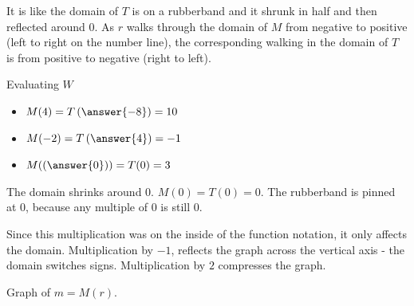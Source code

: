 \documentclass{ximera}
\begin{document}
It is like the domain of $T$ is on a rubberband and it shrunk in half and then reflected around $0$.  As $r$ walks through the domain of $M$ from negative to positive (left to right on the number line), the corresponding walking in the domain of $T$ is from positive to negative (right to left).



\begin{example}  Evaluating $W$

\begin{itemize}
\item $M(4) = T\left(\answer{-8}\right) = 10$
\item $M(-2) = T\left(\answer{4}\right) = -1$
\item $M(\left(\answer{0}\right)) = T(0) = 3$
\end{itemize}


\end{example}


The domain shrinks around $0$. $M(0) = T(0) = 0$.  The rubberband is pinned at $0$, because any multiple of $0$ is still $0$.  









Since this multiplication was on the inside of the function notation, it only affects the domain.  Multiplication by $-1$, reflects the graph across the vertical axis - the domain switches signs. Multiplication by $2$ compresses the graph.



Graph of $m = M(r)$.
\end{document}
